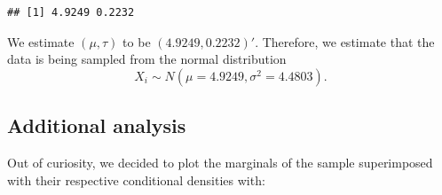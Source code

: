 \documentclass[
  11pt,
]{paper}
\newenvironment{Shaded}{\begin{snugshade}}{\end{snugshade}}
\newcommand{\AttributeTok}[1]{\textcolor[rgb]{0.13,0.29,0.53}{#1}}
\newcommand{\DecValTok}[1]{\textcolor[rgb]{0.00,0.00,0.81}{#1}}
\newcommand{\FloatTok}[1]{\textcolor[rgb]{0.00,0.00,0.81}{#1}}
\newcommand{\FunctionTok}[1]{\textcolor[rgb]{0.13,0.29,0.53}{\textbf{#1}}}
\newcommand{\NormalTok}[1]{#1}
\newcommand{\OtherTok}[1]{\textcolor[rgb]{0.56,0.35,0.01}{#1}}
\newcommand{\SpecialCharTok}[1]{\textcolor[rgb]{0.81,0.36,0.00}{\textbf{#1}}}
\newcommand{\StringTok}[1]{\textcolor[rgb]{0.31,0.60,0.02}{#1}}
\begin{document}
\begin{verbatim}
## [1] 4.9249 0.2232
\end{verbatim}

We estimate \((\mu,\tau)\) to be \((4.9249, 0.2232)'\). Therefore, we
estimate that the data is being sampled from the normal distribution
\begin{equation}
  X_i \sim N(\mu=4.9249,\sigma^2=4.4803).
\end{equation}

\hypertarget{additional-analysis}{%
\subsection{Additional analysis}\label{additional-analysis}}

Out of curiosity, we decided to plot the marginals of the sample
superimposed with their respective conditional densities with:

\begin{Shaded}
\end{Shaded}
\end{document}
